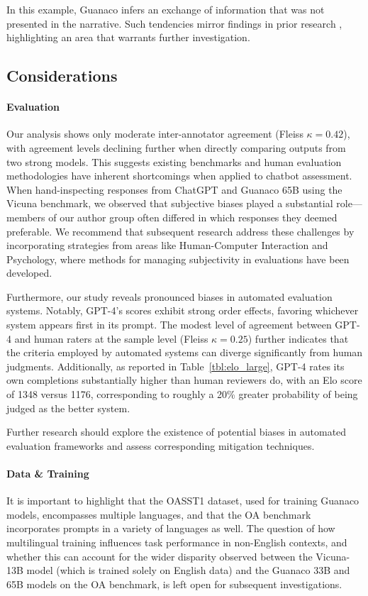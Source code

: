 In this example, {Guanaco} infers an exchange of information that was not presented in the narrative. Such tendencies mirror findings in prior research \cite{sap2022neural}, highlighting an area that warrants further investigation.

\subsection{Considerations}
\label{ssec:considerations}

\paragraph{Evaluation}

Our analysis shows only moderate inter-annotator agreement (Fleiss $\kappa=0.42$), with agreement levels declining further when directly comparing outputs from two strong models. This suggests existing benchmarks and human evaluation methodologies have inherent shortcomings when applied to chatbot assessment. When hand-inspecting responses from ChatGPT and {Guanaco} 65B using the Vicuna benchmark, we observed that subjective biases played a substantial role—members of our author group often differed in which responses they deemed preferable. We recommend that subsequent research address these challenges by incorporating strategies from areas like Human-Computer Interaction and Psychology, where methods for managing subjectivity in evaluations have been developed.

Furthermore, our study reveals pronounced biases in automated evaluation systems. Notably, GPT-4’s scores exhibit strong order effects, favoring whichever system appears first in its prompt. The modest level of agreement between GPT-4 and human raters at the sample level (Fleiss $\kappa=0.25$) further indicates that the criteria employed by automated systems can diverge significantly from human judgments. Additionally, as reported in Table~\ref{tbl:elo_large}, GPT-4 rates its own completions substantially higher than human reviewers do, with an Elo score of 1348 versus 1176, corresponding to roughly a 20\% greater probability of being judged as the better system.

Further research should explore the existence of potential biases in automated evaluation frameworks and assess corresponding mitigation techniques.

\paragraph{Data \& Training} It is important to highlight that the OASST1 dataset, used for training {Guanaco} models, encompasses multiple languages, and that the OA benchmark incorporates prompts in a variety of languages as well. The question of how multilingual training influences task performance in non-English contexts, and whether this can account for the wider disparity observed between the Vicuna-13B model (which is trained solely on English data) and the {Guanaco} 33B and 65B models on the OA benchmark, is left open for subsequent investigations.

